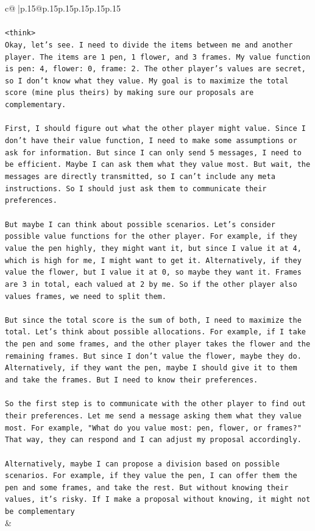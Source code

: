 \documentclass{article}
\begin{document}
{\begin{supertabular}{c@{$\;$}|p{.15\linewidth}@{}p{.15\linewidth}p{.15\linewidth}p{.15\linewidth}p{.15\linewidth}p{.15\linewidth}}
{{{\\ 
\\ 
\texttt{<think>} \\
\texttt{Okay, let's see. I need to divide the items between me and another player. The items are 1 pen, 1 flower, and 3 frames. My value function is pen: 4, flower: 0, frame: 2. The other player's values are secret, so I don't know what they value. My goal is to maximize the total score (mine plus theirs) by making sure our proposals are complementary.} \\
\\ 
\texttt{First, I should figure out what the other player might value. Since I don't have their value function, I need to make some assumptions or ask for information. But since I can only send 5 messages, I need to be efficient. Maybe I can ask them what they value most. But wait, the messages are directly transmitted, so I can't include any meta instructions. So I should just ask them to communicate their preferences.} \\
\\ 
\texttt{But maybe I can think about possible scenarios. Let's consider possible value functions for the other player. For example, if they value the pen highly, they might want it, but since I value it at 4, which is high for me, I might want to get it. Alternatively, if they value the flower, but I value it at 0, so maybe they want it. Frames are 3 in total, each valued at 2 by me. So if the other player also values frames, we need to split them.} \\
\\ 
\texttt{But since the total score is the sum of both, I need to maximize the total. Let's think about possible allocations. For example, if I take the pen and some frames, and the other player takes the flower and the remaining frames. But since I don't value the flower, maybe they do. Alternatively, if they want the pen, maybe I should give it to them and take the frames. But I need to know their preferences.} \\
\\ 
\texttt{So the first step is to communicate with the other player to find out their preferences. Let me send a message asking them what they value most. For example, "What do you value most: pen, flower, or frames?" That way, they can respond and I can adjust my proposal accordingly.} \\
\\ 
\texttt{Alternatively, maybe I can propose a division based on possible scenarios. For example, if they value the pen, I can offer them the pen and some frames, and take the rest. But without knowing their values, it's risky. If I make a proposal without knowing, it might not be complementary} \\
            }
        }
    }
    & \\ \\


\end{supertabular}}
\end{document}
